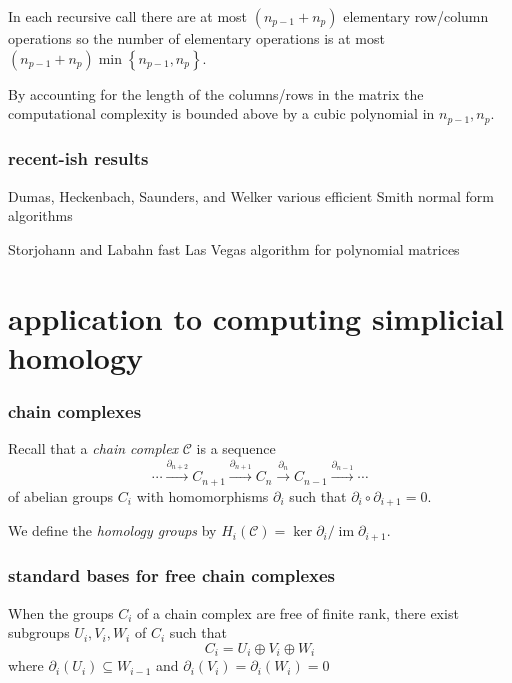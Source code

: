 \documentclass{beamer}
\newcommand{\cbr}[1]{\left\{#1\right\}}
\DeclareMathOperator{\im}{im}
\begin{document}
\begin{frame}
  \frametitle{}

  In each recursive call there are at most $(n_{p-1} + n_p)$ elementary row/column operations so the number of elementary operations is at most $(n_{p-1} + n_p)\min\cbr{n_{p-1} , n_p}$.
  
  By accounting for the length of the columns/rows in the matrix the computational complexity is bounded above by a cubic polynomial in $n_{p-1},n_p$.

\end{frame}

\begin{frame}
  \frametitle{recent-ish results}

  Dumas, Heckenbach, Saunders, and Welker various efficient Smith normal form algorithms \hyperlink{https://membres-ljk.imag.fr/Jean-Guillaume.Dumas/Publications/DHSW.pdf}{}

  Storjohann and Labahn fast Las Vegas algorithm for polynomial matrices \hyperlink{https://cs.uwaterloo.ca/~glabahn/Papers/arne3.pdf}{}

\end{frame}

\section{application to computing simplicial homology}

\begin{frame}
  \frametitle{chain complexes}

  Recall that a \textit{chain complex} $\mathcal{C}$ is a sequence \[\cdots\overset{\partial_{n+2}}{\longrightarrow} C_{n+1} \overset{\partial_{n+1}}{\longrightarrow}C_n\overset{\partial_{n}}{\longrightarrow} C_{n-1}\overset{\partial_{n-1}}{\longrightarrow}\cdots \] of abelian groups $C_i$ with homomorphisms $\partial_i$ such that $\partial_i\circ\partial_{i+1} = 0$.

  We define the \textit{homology groups} by $H_i(\mathcal{C}) = \ker\partial_i/\im\partial_{i+1}$.

\end{frame}

\begin{frame}
  \frametitle{standard bases for free chain complexes}

  When the groups $C_i$ of a chain complex are free of finite rank, there exist subgroups $U_i,V_i,W_i$ of $C_i$ such that \[C_i = U_i\oplus V_i\oplus W_i\] where $\partial_i(U_i)\subseteq W_{i-1}$ and $\partial_i(V_i) = \partial_i(W_i) = 0$

\end{frame}
\end{document}
